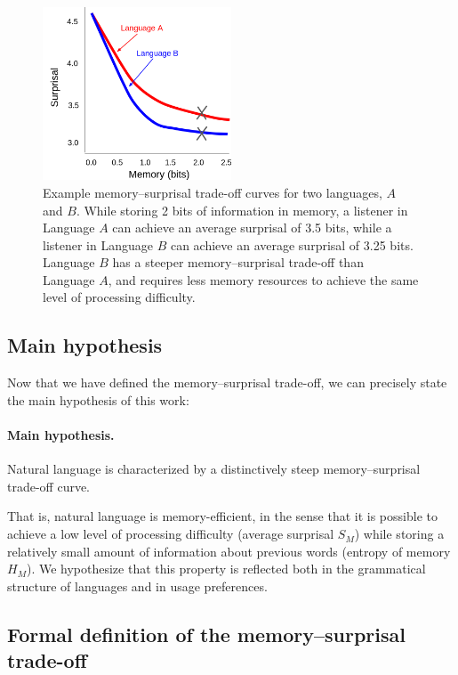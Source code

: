 \begin{figure}
\centering
\includegraphics[width=0.5\textwidth]{figures-gdrive/tradeoff.png}
\caption{Example memory--surprisal trade-off curves for two languages, $A$ and $B$. While storing 2 bits of information in memory, a listener in Language $A$ can achieve an average surprisal of 3.5 bits, while a listener in Language $B$ can achieve an average surprisal of 3.25 bits. Language $B$ has a steeper memory--surprisal trade-off than Language $A$, and requires less memory resources to achieve the same level of processing difficulty.}
\label{fig:examples}
\end{figure}

\subsection{Main hypothesis}

Now that we have defined the memory--surprisal trade-off, we can precisely state the main hypothesis of this work:

\paragraph{Main hypothesis.}  Natural language is characterized by a distinctively steep memory--surprisal trade-off curve.

That is, natural language is memory-efficient, in the sense that it is possible to achieve a low level of processing difficulty (average surprisal $S_M$) while storing a relatively small amount of information about previous words (entropy of memory $H_M$). We hypothesize that this property is reflected both in the grammatical structure of languages and in usage preferences.


\subsection{Formal definition of the memory--surprisal trade-off}
\label{sec:formal-tradeoff}

